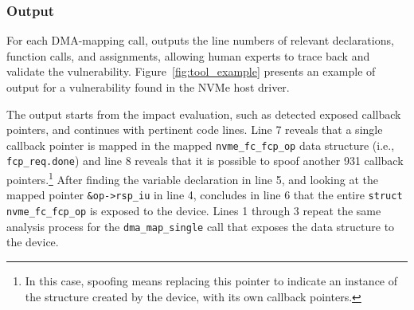 
\subsubsection{Output}
%
For each DMA-mapping call, \tool outputs the line numbers of relevant declarations, function calls, and assignments, allowing human experts to trace back and validate the vulnerability. Figure~\ref{fig:tool_example} presents an example of output for a vulnerability found in the NVMe host driver.

The output starts from the impact evaluation,  such as detected exposed callback pointers, and continues with pertinent code lines. %
Line 7 reveals that a single callback pointer is mapped in the mapped \texttt{nvme\_fc\_fcp\_op} data structure (i.e., \texttt{fcp\_req.done}) and line 8 reveals that it is possible to spoof another 931 callback pointers.\footnote{In this case, spoofing means replacing this pointer to indicate an instance of the structure created by the device, with its own callback pointers.}
After finding the variable declaration in line 5, and looking at the mapped pointer \texttt{\&op->rsp\_iu} in line 4, \tool concludes in line 6  that the entire \texttt{struct nvme\_fc\_fcp\_op} is exposed to the device. Lines 1 through 3 repeat the same analysis process for the \texttt{dma\_map\_single} call that exposes the data structure to the device. 

